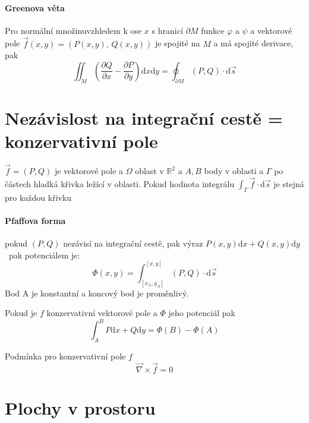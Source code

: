 \documentclass[a4paper, twoside,%
12pt]{article}
\newcommand{\dif}{\mathrm{d}}
\newcommand{\R}{\mathbb{R}}
\newcommand{\pard}[2]{\frac{\partial #1 }{\partial #2 }}
\begin{document}
\paragraph{Greenova věta} Pro normální množinuvzhledem k ose $x$ s hranicí $\partial M$ funkce $\varphi$ a $\psi$ a vektorové pole $\vec{f}(x,y)=(P(x,y),\,Q(x,y))$ je spojité na $M$ a má spojité derivace, pak 
$$\iint_M\left(\pard{Q}{x}-\pard{P}{y}\right)\dif x \dif y = \oint_{\partial M} (P,Q)\cdot \dif \vec{s}$$

\section{Nezávislost na integrační cestě = konzervativní pole}

$\vec{f}= (P,Q)$ je vektorové pole a $\Omega$ oblast v $\R^2$ a $A, B$ body v oblasti a $\Gamma$ po částech hladká křivka ležící v oblasti. Pokud hodnota integrálu $\int_\Gamma \vec{f}\cdot \dif \vec s$ je stejná pro každou křivku 

\paragraph{Pfaffova forma} pokud $(P,Q)$ nezávisí na integrační cestě, pak výraz $P(x,y) \dif x + Q(x,y) \dif y$ \ pak potenciálem je:
$$\Phi(x,y) = \int_{[x_A,y_A]}^{[x,y]}(P,Q)\cdot \dif \vec{s}$$
Bod A je konstantní a koncový bod je proměnlivý.

Pokud je $f$ konzervativní vektorové pole a $\Phi$ jeho potenciál pak 
$$\int_A^B P\dif x + Q \dif y = \Phi(B)-\Phi(A)$$

Podmínka pro konzervativní pole $f$
$$ \vec\nabla \times\vec f = 0 $$

\section{Plochy v prostoru}
\end{document}
